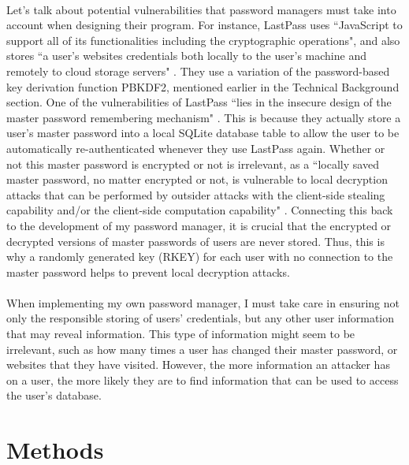 \documentclass[10pt,twocolumn]{article}
\begin{document}
\paragraph{}
Let's talk about potential vulnerabilities that password managers must take into account when designing their program. For instance, LastPass uses ``JavaScript to support all of its functionalities including the cryptographic operations", and also stores ``a user's websites credentials both locally to the user's machine and remotely to cloud storage servers" \cite{zhao2013security}. They use a variation of the password-based key derivation function PBKDF2, mentioned earlier in the Technical Background section. One of the vulnerabilities of LastPass ``lies in the insecure design of the master password remembering mechanism" \cite{zhao2013security}. This is because they actually store a user's master password into a local SQLite database table to allow the user to be automatically re-authenticated whenever they use LastPass again. Whether or not this master password is encrypted or not is irrelevant, as a ``locally saved master password, no matter encrypted or not, is vulnerable to local decryption attacks that can be performed by outsider attacks with the client-side stealing capability and/or the client-side computation capability" \cite{zhao2013security}. Connecting this back to the development of my password manager, it is crucial that the encrypted or decrypted versions of master passwords of users are never stored. Thus, this is why a randomly generated key (RKEY) for each user with no connection to the master password helps to prevent local decryption attacks.
\paragraph{}
When implementing my own password manager, I must take care in ensuring not only the responsible storing of users' credentials, but any other user information that may reveal information. This type of information might seem to be irrelevant, such as how many times a user has changed their master password, or websites that they have visited. However, the more information an attacker has on a user, the more likely they are to find information that can be used to access the user's database. 

\section{Methods}
\end{document}
